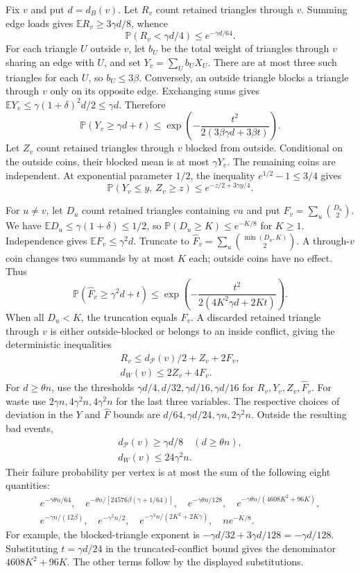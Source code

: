 \documentclass[english,11pt,a4paper]{article}
\begin{document}
Fix \(v\) and put \(d=d_B(v)\). Let \(R_v\) count retained triangles through \(v\). Summing edge loads gives \(\mathbb ER_v\ge3\gamma d/8\), whence \[\mathbb P(R_v<\gamma d/4)\le e^{-\gamma d/64}.\] For each triangle \(U\) outside \(v\), let \(b_U\) be the total weight of triangles through \(v\) sharing an edge with \(U\), and set \(Y_v=\sum_U b_UX_U\). There are at most three such triangles for each \(U\), so \(b_U\le3\beta\). Conversely, an outside triangle blocks a triangle through \(v\) only on its opposite edge. Exchanging sums gives \(\mathbb EY_v\le\gamma(1+\delta)^2d/2\le\gamma d\). Therefore \[\mathbb P(Y_v\ge\gamma d+t)
\le\exp\left(-\frac{t^2}{2(3\beta\gamma d+3\beta t)}\right).\] Let \(Z_v\) count retained triangles through \(v\) blocked from outside. Conditional on the outside coins, their blocked mean is at most \(\gamma Y_v\). The remaining coins are independent. At exponential parameter \(1/2\), the inequality \(e^{1/2}-1\le3/4\) gives \[\mathbb P(Y_v\le y,\ Z_v\ge z)\le e^{-z/2+3\gamma y/4}.\]

For \(u\ne v\), let \(D_u\) count retained triangles containing \(vu\) and put \(F_v=\sum_u\binom{D_u}{2}\). We have \(\mathbb ED_u\le\gamma(1+\delta)\le1/2\), so \(\mathbb P(D_u\ge K)\le e^{-K/8}\) for \(K\ge1\). Independence gives \(\mathbb EF_v\le\gamma^2d\). Truncate to \(\widehat F_v=\sum_u\binom{\min(D_u,K)}2\). A through-\(v\) coin changes two summands by at most \(K\) each; outside coins have no effect. Thus \[\mathbb P(\widehat F_v\ge\gamma^2d+t)
\le\exp\left(-\frac{t^2}{2(4K^2\gamma d+2Kt)}\right).\] When all \(D_u<K\), the truncation equals \(F_v\). A discarded retained triangle through \(v\) is either outside-blocked or belongs to an inside conflict, giving the deterministic inequalities \[\begin{gathered}
R_v\le d_{\mathcal P}(v)/2+Z_v+2F_v,\\
d_W(v)\le2Z_v+4F_v.
\end{gathered}\] For \(d\ge\theta n\), use the thresholds \(\gamma d/4,d/32,\gamma d/16,\gamma d/16\) for \(R_v,Y_v,Z_v,\widehat F_v\). For waste use \(2\gamma n,4\gamma^2n,4\gamma^2n\) for the last three variables. The respective choices of deviation in the \(Y\) and \(\widehat F\) bounds are \(d/64,\gamma d/24,\gamma n,2\gamma^2n\). Outside the resulting bad events, \[\begin{gathered}
d_{\mathcal P}(v)\ge\gamma d/8\quad(d\ge\theta n),\\
d_W(v)\le24\gamma^2n.
\end{gathered}\] Their failure probability per vertex is at most the sum of the following eight quantities: \[\begin{gathered}
e^{-\gamma\theta n/64},\quad
e^{-\theta n/[24576\beta(\gamma+1/64)]},\quad
e^{-\gamma\theta n/128},\quad
e^{-\gamma\theta n/(4608K^2+96K)},\\
e^{-\gamma n/(12\beta)},\quad e^{-\gamma^2n/2},\quad
e^{-\gamma^3n/(2K^2+2K\gamma)},\quad ne^{-K/8}.
\end{gathered}\] For example, the blocked-triangle exponent is \(-\gamma d/32+3\gamma d/128=-\gamma d/128\). Substituting \(t=\gamma d/24\) in the truncated-conflict bound gives the denominator \(4608K^2+96K\). The other terms follow by the displayed substitutions.
\end{document}
